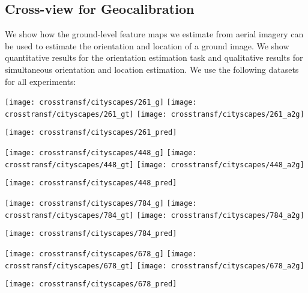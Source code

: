 \subsection{Cross-view for Geocalibration}


We show how the ground-level feature maps we estimate from aerial
imagery can be used to estimate the orientation and location of a
ground image.  We show quantitative results for the orientation
estimation task and qualitative results for simultaneous orientation
and location estimation. We use the following datasets for all
experiments:




\begin{figure*}
  \setlength{\aheight}{53.55pt}
  \setlength{\gwidth}{44.574pt}
  \centering

  \begin{minipage}[b]{\gwidth}
  \texttt{[image: crosstransf/cityscapes/261\_g]}
  \texttt{[image: crosstransf/cityscapes/261\_gt]}
  \texttt{[image: crosstransf/cityscapes/261\_a2g]}
  \end{minipage}
  \texttt{[image: crosstransf/cityscapes/261\_pred]}
  \hfill
  \begin{minipage}[b]{\gwidth}
  \texttt{[image: crosstransf/cityscapes/448\_g]}
  \texttt{[image: crosstransf/cityscapes/448\_gt]}
  \texttt{[image: crosstransf/cityscapes/448\_a2g]}
  \end{minipage}
  \texttt{[image: crosstransf/cityscapes/448\_pred]}
  \hfill
  \begin{minipage}[b]{\gwidth}
  \texttt{[image: crosstransf/cityscapes/784\_g]}
  \texttt{[image: crosstransf/cityscapes/784\_gt]}
  \texttt{[image: crosstransf/cityscapes/784\_a2g]}
  \end{minipage}
  \texttt{[image: crosstransf/cityscapes/784\_pred]}
  \hfill
  \begin{minipage}[b]{\gwidth}
  \texttt{[image: crosstransf/cityscapes/678\_g]}
  \texttt{[image: crosstransf/cityscapes/678\_gt]}
  \texttt{[image: crosstransf/cityscapes/678\_a2g]}
  \end{minipage}
  \texttt{[image: crosstransf/cityscapes/678\_pred]}


\end{figure*}
